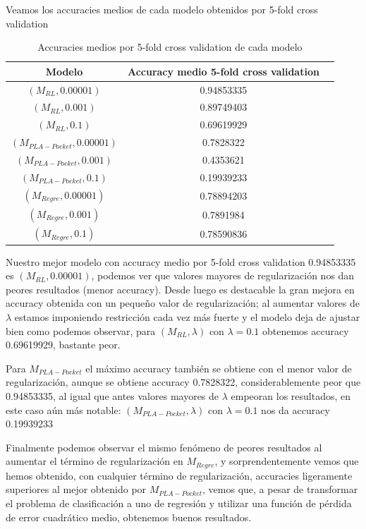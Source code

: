 \documentclass[11pt,a4paper]{article}
\theoremstyle{definition}
\begin{document}
	Veamos los accuracies medios de cada modelo obtenidos por 5-fold cross validation
	\begin{table}[H]
	\begin{center}
	\begin{tabular}{|c|c|c|}
	\hline
	 Modelo & Accuracy medio 5-fold cross validation \\
	\hline \hline
	$(M_{RL},0.00001)$ & 0.94853335 \\ \hline
	$(M_{RL},0.001)$ & 0.89749403 \\ \hline
	$(M_{RL},0.1)$ & 0.69619929 \\ \hline
	$(M_{PLA-Pocket},0.00001)$ & 0.7828322 \\ \hline
	$(M_{PLA-Pocket},0.001)$ & 0.4353621 \\ \hline
	$(M_{PLA-Pocket},0.1)$ & 0.19939233 \\ \hline
	$(M_{Regre},0.00001)$ & 0.78894203 \\ \hline
	$(M_{Regre},0.001)$ & 0.7891984 \\ \hline
	$(M_{Regre},0.1)$ & 0.78590836 \\ \hline
	\end{tabular}
	\caption{Accuracies medios por 5-fold cross validation de cada modelo}
	\label{tabla:sencilla}
	\end{center}
	\end{table}
	Nuestro mejor modelo con accuracy medio por 5-fold cross validation 0.94853335 es $(M_{RL},0.00001)$, podemos ver que valores mayores de regularización nos dan peores resultados (menor accuracy). Desde luego es destacable la gran mejora en accuracy obtenida con un pequeño valor de regularización; al aumentar valores de $\lambda$ estamos imponiendo restricción cada vez más fuerte y el modelo deja de ajustar bien como podemos observar, para $(M_{RL},\lambda)$ con $\lambda=0.1$ obtenemos accuracy 0.69619929, bastante peor. 
	
	Para $M_{PLA-Pocket}$ el máximo accuracy también se obtiene con el menor valor de regularización, aunque se obtiene accuracy 0.7828322, considerablemente peor que 0.94853335, al igual que antes valores mayores de $\lambda$ empeoran los resultados, en este caso aún más notable: $(M_{PLA-Pocket},\lambda)$ con $\lambda =0.1$ nos da accuracy 0.19939233
	
	 Finalmente podemos observar el mismo fenómeno de peores resultados al aumentar el término de regularización  en $M_{Regre}$, y sorprendentemente vemos que hemos obtenido, con cualquier término de regularización, accuracies ligeramente superiores al mejor obtenido por $M_{PLA-Pocket}$, vemos que, a pesar de transformar el problema de clasificación a uno de regresión y utilizar una función de pérdida de error cuadrático medio, obtenemos buenos resultados.\\
	
\end{document}
